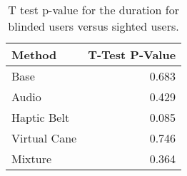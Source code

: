 
\begin{table}[!htb]
\centering
\caption{T test p-value for the duration for blinded users versus sighted users.}
\label{tab:ttest_duration}
\begin{tabular}{lr}
\toprule
      Method &  T-Test P-Value \\
\midrule
        Base &           0.683 \\
       Audio &           0.429 \\
 Haptic Belt &           0.085 \\
Virtual Cane &           0.746 \\
     Mixture &           0.364 \\
\bottomrule
\end{tabular}
\end{table}

